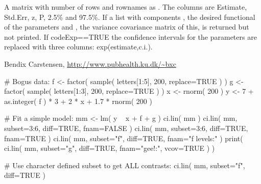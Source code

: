 \begin{Value}
A matrix with number of rows and rownames as . The
columns are Estimate, Std.Err, z, P, 2.5\% and 97.5\%.
If  a list with components , the desired
functional of the parameters and , the variance
covariance matrix of this, is returned but not printed.
If code{Exp==TRUE} the confidence intervals for the parameters are
replaced with three columns: exp(estimate,c.i.).
\end{Value}
\begin{Author}\relax
Bendix Carstensen,
\url{http://www.pubhealth.ku.dk/~bxc}
\end{Author}
\begin{Examples}
\begin{ExampleCode}
# Bogus data:
f <- factor( sample( letters[1:5], 200, replace=TRUE ) )
g <- factor( sample( letters[1:3], 200, replace=TRUE ) )
x <- rnorm( 200 )
y <- 7 + as.integer( f ) * 3 + 2 * x + 1.7 * rnorm( 200 )

# Fit a simple model:
mm <- lm( y ~ x + f + g )
ci.lin( mm ) 
ci.lin( mm, subset=3:6, diff=TRUE, fnam=FALSE )
ci.lin( mm, subset=3:6, diff=TRUE, fnam=TRUE )
ci.lin( mm, subset="f", diff=TRUE, fnam="f levels:" )
print( ci.lin( mm, subset="g", diff=TRUE, fnam="gee!:", vcov=TRUE ) )

# Use character defined subset to get ALL contrasts:
ci.lin( mm, subset="f", diff=TRUE )
\end{ExampleCode}
\end{Examples}

